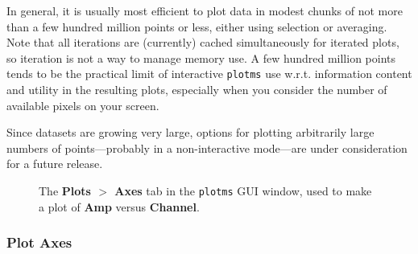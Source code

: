In general, it is usually most efficient to plot data in modest
chunks of not more than a few hundred million points or less,
either using selection or averaging.  Note that all iterations
are (currently) cached simultaneously for iterated plots, so 
iteration is not a way to manage memory use.  A few hundred
million points tends to be the practical limit of interactive
{\tt plotms} use w.r.t. information content and utility in the 
resulting plots, especially when you consider the number of available
pixels on your screen.  

Since datasets are growing very large, options for plotting
arbitrarily large numbers of points---probably in a 
non-interactive mode---are under consideration for a future release.


\begin{figure}[h!]
\begin{center}
\caption{\label{fig:plotms_axes} The {\bf Plots $>$ Axes} tab in the {\tt plotms} GUI window, used to make a plot of {\bf Amp} versus {\bf Channel}.} 
\hrulefill
\end{center}
\end{figure}

\subsubsection{Plot Axes}
\label{section:edit.plot.plotms.axes}


